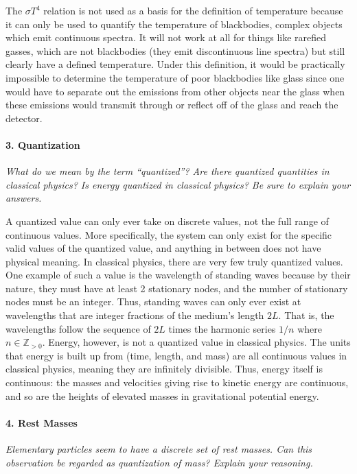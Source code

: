 \documentclass[12pt]{article}
\begin{document}
The $\sigma T^4$ relation is not used as a basis for the definition of temperature because it can only be used to quantify the temperature of blackbodies, complex objects which emit continuous spectra. It will not work at all for things like rarefied gasses, which are not blackbodies (they emit discontinuous line spectra) but still clearly have a defined temperature. Under this definition, it would be practically impossible to determine the temperature of poor blackbodies like glass since one would have to separate out the emissions from other objects near the glass when these emissions would transmit through or reflect off of the glass and reach the detector.

\paragraph{3. Quantization} \emph{What do we mean by the term “quantized”? Are there quantized quantities in classical physics? Is energy quantized in classical physics? Be sure to explain your answers.} \medskip

A quantized value can only ever take on discrete values, not the full range of continuous values. More specifically, the system can only exist for the specific valid values of the quantized value, and anything in between does not have physical meaning. In classical physics, there are very few truly quantized values. One example of such a value is the wavelength of standing waves because by their nature, they must have at least 2 stationary nodes, and the number of stationary nodes must be an integer. Thus, standing waves can only ever exist at wavelengths that are integer fractions of the medium's length $2L$. That is, the wavelengths follow the sequence of $2L$ times the harmonic series $1/n$ where $n \in \mathbb{Z}_{>0}$. Energy, however, is not a quantized value in classical physics. The units that energy is built up from (time, length, and mass) are all continuous values in classical physics, meaning they are infinitely divisible. Thus, energy itself is continuous: the masses and velocities giving rise to kinetic energy are continuous, and so are the heights of elevated masses in gravitational potential energy.

\paragraph{4. Rest Masses} \emph{Elementary particles seem to have a discrete set of rest masses. Can this observation be regarded as quantization of mass? Explain your reasoning.} \medskip
\end{document}
